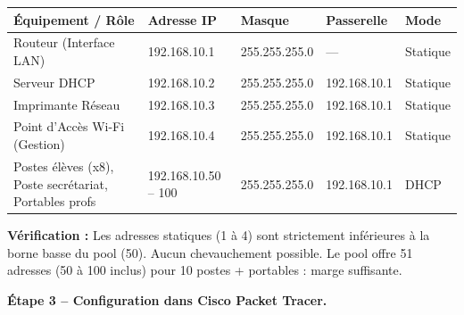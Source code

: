\documentclass[11pt]{article}
\begin{document}
\begin{exoresolu}
\begin{center}
\begin{tabularx}{\linewidth}{|l|l|l|l|X|}
\hline
\rowcolor{popblueL}
\textbf{Équipement / Rôle} & \textbf{Adresse IP} & \textbf{Masque} & \textbf{Passerelle} & \textbf{Mode} \\
\hline
Routeur (Interface LAN) & 192.168.10.1 & 255.255.255.0 & --- & Statique \\
\hline
Serveur DHCP & 192.168.10.2 & 255.255.255.0 & 192.168.10.1 & Statique \\
\hline
Imprimante Réseau & 192.168.10.3 & 255.255.255.0 & 192.168.10.1 & Statique \\
\hline
Point d'Accès Wi-Fi (Gestion) & 192.168.10.4 & 255.255.255.0 & 192.168.10.1 & Statique \\
\hline
Postes élèves (x8), Poste secrétariat, Portables profs & 192.168.10.50 -- 100 & 255.255.255.0 & 192.168.10.1 & DHCP \\
\hline
\end{tabularx}
\end{center}

\textbf{Vérification :} Les adresses statiques (1 à 4) sont strictement inférieures à la borne basse du pool (50). Aucun chevauchement possible. Le pool offre 51 adresses (50 à 100 inclus) pour 10 postes + portables : marge suffisante.

\textbf{Étape 3 -- Configuration dans Cisco Packet Tracer.}


\end{exoresolu}
\end{document}
